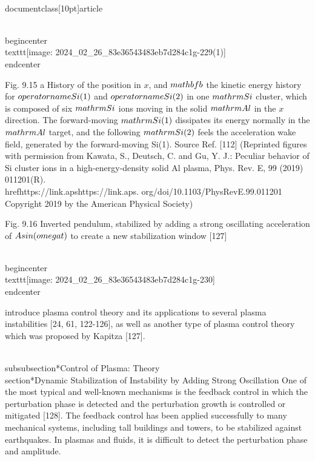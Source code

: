 \\documentclass[10pt]{article}
\begin{document}
{{{{{{\\begin{center}
\\texttt{[image: 2024\_02\_26\_83e36543483eb7d284c1g-229(1)]}
\\end{center}

Fig. 9.15 a History of the position in $x$, and $\\mathbf{b}$ the kinetic energy history for $\\operatorname{Si}(1)$ and $\\operatorname{Si}(2)$ in one $\\mathrm{Si}$ cluster, which is composed of six $\\mathrm{Si}$ ions moving in the solid $\\mathrm{Al}$ in the $x$ direction. The forward-moving $\\mathrm{Si}(1)$ dissipates its energy normally in the $\\mathrm{Al}$ target, and the following $\\mathrm{Si}(2)$ feels the acceleration wake field, generated by the forward-moving Si(1). Source Ref. [112] (Reprinted figures with permission from Kawata, S., Deutsch, C. and Gu, Y. J.: Peculiar behavior of Si cluster ions in a high-energy-density solid Al plasma, Phys. Rev. E, 99 (2019) 011201(R). \\href{https://link.aps}{https://link.aps}. org/doi/10.1103/PhysRevE.99.011201 Copyright 2019 by the American Physical Society)

Fig. 9.16 Inverted pendulum, stabilized by adding a strong oscillating acceleration of $A \\sin (\\omega t)$ to create a new stabilization window [127]

\\begin{center}
\\texttt{[image: 2024\_02\_26\_83e36543483eb7d284c1g-230]}
\\end{center}

introduce plasma control theory and its applications to several plasma instabilities [24, 61, 122-126], as well as another type of plasma control theory which was proposed by Kapitza [127].

\\subsubsection*{Control of Plasma: Theory}
\\section*{Dynamic Stabilization of Instability by Adding Strong Oscillation}
One of the most typical and well-known mechanisms is the feedback control in which the perturbation phase is detected and the perturbation growth is controlled or mitigated [128]. The feedback control has been applied successfully to many mechanical systems, including tall buildings and towers, to be stabilized against earthquakes. In plasmas and fluids, it is difficult to detect the perturbation phase and amplitude.

}}}}}}
\end{document}

